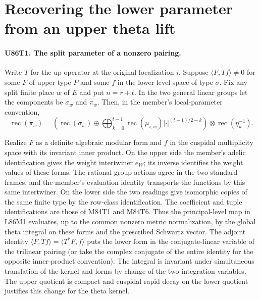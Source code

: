 \section{Recovering the lower parameter from an upper theta lift}

\paragraph{U86T1. The split parameter of a nonzero pairing.}
Write $T$ for the up operator at the original localization $i$.
Suppose $\langle F,Tf\rangle\ne0$ for some $F$ of upper type $P$
and some $f$ in the lower level space of type $\sigma$. Fix any
split finite place $w$ of $E$ and put $n=r+t$. In the two general
linear groups let the components be $\sigma_w$ and $\pi_w$.
Then, in the member's local-parameter convention,
\[
 \operatorname{rec}(\pi_w)=
 \left(\operatorname{rec}(\sigma_w)\oplus
      \bigoplus_{k=0}^{t-1}\operatorname{rec}(\mu_{i,w})
                  |\cdot|^{(t-1)/2-k}\right)\otimes
                     \operatorname{rec}(\eta_w^{-1}).
 \tag{1}
\]

Realize $F$ as a definite algebraic modular form and $f$ in the
cuspidal multiplicity space with its invariant inner product.
On the upper side the member's adelic identification gives the
weight intertwiner $e_W$; its inverse identifies the weight values
of these forms. The rational group actions agree in the two standard
frames, and the member's evaluation identity transports the functions
by this same intertwiner. On the lower side the two readings give
isomorphic copies of the same finite type by the row-class
identification. The coefficient and tuple identifications are those
of M84T1 and M84T6. Thus the principal-level map in L86M1 evaluates,
up to the common nonzero metric normalization, by the global theta
integral on these forms and the prescribed Schwartz vector.
The adjoint identity $\langle F,Tf\rangle=\langle T^*F,f\rangle$
puts the lower form in the conjugate-linear variable of the
trilinear pairing (or take the complex conjugate of the entire
identity for the opposite inner-product convention).
The integral is invariant under simultaneous translation of the
kernel and forms by change of the two integration variables.
The upper quotient is compact and cuspidal rapid decay on the
lower quotient justifies this change for the theta kernel.

